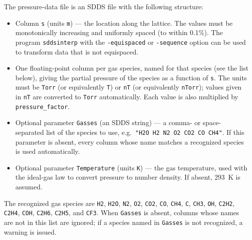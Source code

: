 \documentclass[11pt]{article}
\begin{document}
The pressure-data file is an SDDS file with the following structure:
\begin{itemize}
\item Column \verb|s| (units \verb|m|) --- the location along the lattice. The values must be
  monotonically increasing and uniformly spaced (to within 0.1\%). The program \verb|sddsinterp| with
  the \verb|-equispaced| or \verb|-sequence| option can be used to transform data that is not
  equispaced.
\item One floating-point column per gas species, named for that species (see the list below), giving
  the partial pressure of the species as a function of \verb|s|. The units must be \verb|Torr| (or
  equivalently \verb|T|) or \verb|nT| (or equivalently \verb|nTorr|); values given in \verb|nT| are
  converted to \verb|Torr| automatically. Each value is also multiplied by \verb|pressure_factor|.
\item Optional parameter \verb|Gasses| (an SDDS string) --- a comma- or space-separated list of the
  species to use, e.g.\ \verb|"H2O H2 N2 O2 CO2 CO CH4"|. If this parameter is absent, every column
  whose name matches a recognized species is used automatically.
\item Optional parameter \verb|Temperature| (units \verb|K|) --- the gas temperature, used with the
  ideal-gas law to convert pressure to number density. If absent, 293~K is assumed.
\end{itemize}
The recognized gas species are
\verb|H2|, \verb|H2O|, \verb|N2|, \verb|O2|, \verb|CO2|, \verb|CO|, \verb|CH4|, \verb|C|,
\verb|CH3|, \verb|OH|, \verb|C2H2|, \verb|C2H4|, \verb|COH|, \verb|C2H6|, \verb|C2H5|, and
\verb|CF3|. When \verb|Gasses| is absent, columns whose names are not in this list are ignored; if a
species named in \verb|Gasses| is not recognized, a warning is issued.
\end{document}
